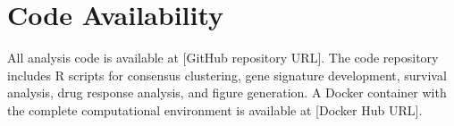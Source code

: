 \documentclass[11pt,a4paper]{article}
\begin{document}
\section*{Code Availability}

All analysis code is available at [GitHub repository URL]. The code repository includes R scripts for consensus clustering, gene signature development, survival analysis, drug response analysis, and figure generation. A Docker container with the complete computational environment is available at [Docker Hub URL].
\end{document}
